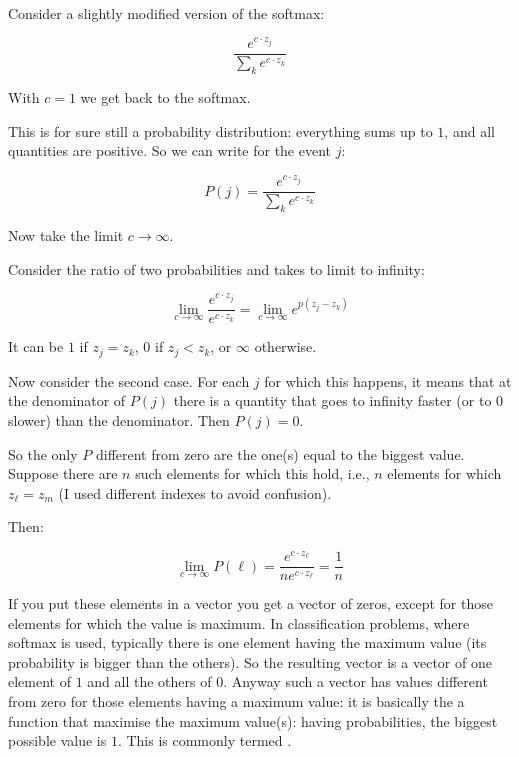 \paragraph{}Consider a slightly modified version of the softmax: 

$$\frac{e^{c\cdot z_j}}{\sum_k e^{c\cdot z_k}}$$

With $c=1$ we get back to the softmax.

This is for sure still a probability distribution: everything sums up to $1$, and all quantities are positive. So we can write for the event $j$:

$$P(j) = \frac{e^{c\cdot z_j}}{\sum_k e^{c\cdot z_k}}$$

Now take the limit $c\rightarrow\infty$.

Consider the ratio of two probabilities and takes to limit to infinity:

$$\lim_{c\rightarrow \infty}\frac{e^{c\cdot z_j}}{e^{c\cdot z_k}} = \lim_{c\rightarrow \infty} e^{p(z_j-z_k)}$$

It can be $1$ if $z_j=z_k$, $0$ if $z_j<z_k$, or $\infty$ otherwise.

Now consider the second case. For each $j$ for which this happens, it means that at the denominator of $P(j)$ there is a quantity that goes to infinity faster (or to $0$ slower) than the denominator. Then $P(j)=0$.

So the only $P$ different from zero are the one(s) equal to the biggest value. Suppose there are $n$ such elements for which this hold, i.e., $n$ elements for which $z_\ell=z_m$ (I used different indexes to avoid confusion).

Then:

$$\lim_{c\rightarrow \infty} P(\ell) = \frac{e^{c\cdot z_\ell}}{n e^{c\cdot z_\ell}}  = \frac{1}{n}$$

If you put these elements in a vector you get a vector of zeros, except for those elements for which the value is maximum. In classification problems, where softmax is used, typically there is one element having the maximum value (its probability is bigger than the others). So the resulting vector is a vector of one element of $1$ and all the others of $0$. Anyway such a vector has values different from zero for those elements having a maximum value: it is basically the a function that maximise the maximum value(s): having probabilities, the biggest possible value is $1$. This is commonly termed . 

